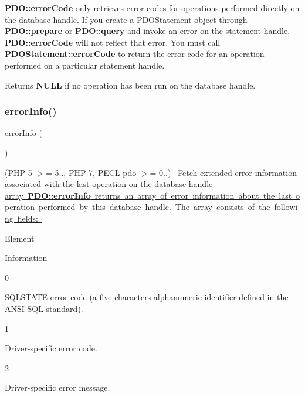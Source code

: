 {\bfseries P\+D\+O\+::error\+Code} only retrieves error codes for operations performed directly on the database handle. If you create a P\+D\+O\+Statement object through {\bfseries P\+D\+O\+::prepare} or {\bfseries P\+D\+O\+::query} and invoke an error on the statement handle, {\bfseries P\+D\+O\+::error\+Code} will not reflect that error. You must call {\bfseries P\+D\+O\+Statement\+::error\+Code} to return the error code for an operation performed on a particular statement handle. 

Returns {\bfseries N\+U\+LL} if no operation has been run on the database handle. \mbox{\label{interface_pes_1_1_database_1_1_handler_1_1_mini_1_1_p_d_o_interface_ac5230ce6cd46c5e922146a441d807877}} 
\subsubsection{\texorpdfstring{error\+Info()}{errorInfo()}}
{\footnotesize\ttfamily error\+Info (\begin{DoxyParamCaption}{ }\end{DoxyParamCaption})}

(P\+HP 5 $>$= 5.., P\+HP 7, P\+E\+CL pdo $>$= 0..)~\newline
 Fetch extended error information associated with the last operation on the database handle \mbox{\hyperlink{}{array {\bfseries P\+D\+O\+::error\+Info} returns an array of error information about the last operation performed by this database handle. The array consists of the following fields\+: }} 

Element 

Information  

0 

S\+Q\+L\+S\+T\+A\+TE error code (a five characters alphanumeric identifier defined in the A\+N\+SI S\+QL standard).  

1 

Driver-\/specific error code.  

2 

Driver-\/specific error message.  

